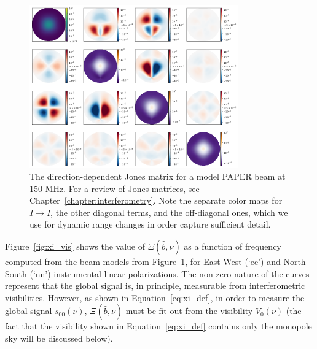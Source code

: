 \begin{figure}
\centering
\includegraphics[width=0.8\textwidth]{chapters/global_signal/figures/full_mueller_150MHz.png}
\caption[The direction-dependent Jones matrix for a model PAPER beam at 150 MHz.]{The direction-dependent Jones matrix for a model PAPER beam at 150 MHz. For a review of Jones matrices, see Chapter~\ref{chapter:interferometry}. Note the separate color maps for $I\rightarrow I$, the other diagonal terms, and the off-diagonal ones, which we use for dynamic range changes in order capture sufficient detail.}
\label{fig:paper_jones}
\end{figure}

Figure~\ref{fig:xi_vis} shows the value of $\Xi(\hat{b},\nu)$ as a function of frequency computed from the beam models from Figure~\ref{fig:paper_jones}, for East-West (`ee') and North-South (`nn') instrumental linear polarizations. The non-zero nature of the curves represent that the global signal is, in principle, measurable from interferometric visibilities. However, as shown in Equation~\ref{eq:xi_def}, in order to measure the global signal $s_{00}(\nu)$, $\Xi(\hat{b},\nu)$ must be fit-out from the visibility $V_0(\nu)$ (the fact that the visibility shown in Equation~\ref{eq:xi_def} contains only the monopole sky will be discussed below). 


